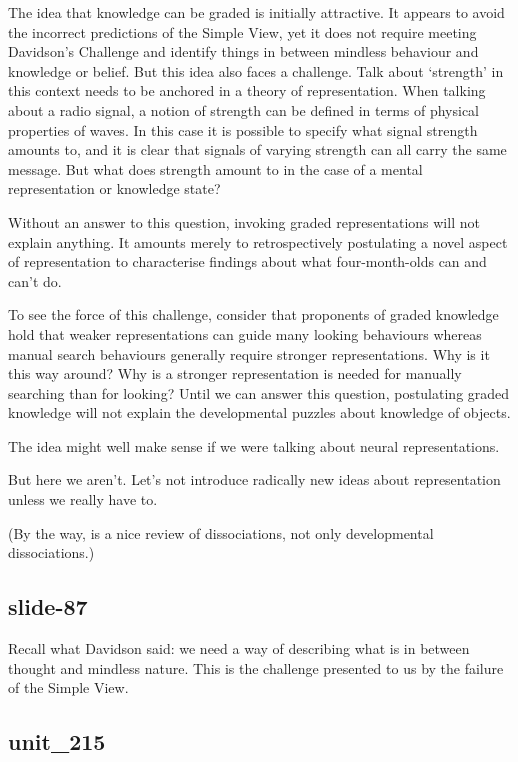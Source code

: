 \documentclass[12pt,\papersize]{extarticle}
\begin{document}
The idea that knowledge can be graded is initially attractive.
It appears to avoid the incorrect predictions of the Simple View, yet it does not require meeting Davidson’s Challenge and identify things in between mindless behaviour and knowledge or belief.
But this idea also faces a challenge.
Talk about ‘strength’ in this context needs to be anchored in a theory of representation.
When talking about a radio signal, a notion of strength can be defined in
terms of physical properties of waves.
In this case it is possible to specify what signal strength amounts to, and it is clear that signals of varying strength can all carry the same message.
But what does strength amount to in the case of a mental representation or knowledge state?

Without an answer to this question, invoking graded representations will not explain anything.
It amounts merely to retrospectively postulating a novel aspect of representation to characterise findings about what four-month-olds can and can’t do.

To see the force of this challenge, consider that proponents of graded knowledge hold that weaker representations can guide many looking behaviours whereas manual search behaviours generally require stronger representations.
Why is it this way around?
Why is a stronger representation is needed for manually searching than for looking?
Until we can answer this question, postulating graded knowledge will not explain the developmental puzzles about knowledge of objects.

The idea might well make sense if we were talking about neural representations.

But here we aren't.  Let's not introduce radically new ideas about representation unless we really have to.

(By the way, \citet{Munakata:2001ch} is a nice review of dissociations, not only developmental dissociations.)

\subsection{slide-87}
Recall what Davidson said: we need a way of describing what is in between thought and
mindless nature.  This is the challenge presented to us by the failure of the Simple View.

\subsection{unit\_215}
\end{document}
